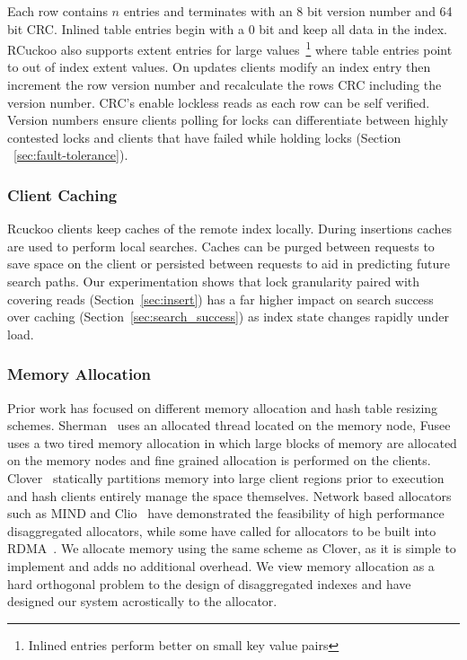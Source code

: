Each row contains $n$ entries and terminates with an 8 bit
version number and 64 bit CRC. Inlined table entries begin
with a 0 bit and keep all data in the index. RCuckoo also
supports extent entries for large values~\footnote{Inlined
entries perform better on small key value pairs} where table
entries point to out of index extent values. On updates
clients modify an index entry then increment the row version
number and recalculate the rows CRC including the version
number. CRC's enable lockless reads as each row can be self
verified. Version numbers ensure clients polling for locks
can differentiate between highly contested locks and clients
that have failed while holding locks (Section
~\ref{sec:fault-tolerance}).


\subsubsection{Client Caching}

Rcuckoo clients keep caches of the remote index locally.
During insertions caches are used to perform local searches.
Caches can be purged between requests to save space on the
client or persisted between requests to aid in predicting
future search paths. Our experimentation shows that lock
granularity paired with covering reads
(Section~\ref{sec:insert}) has a far higher impact on search
success over caching (Section~\ref{sec:search_success}) as
index state changes rapidly under load.

\subsubsection{Memory Allocation}
Prior work has focused on different memory allocation and
hash table resizing schemes. Sherman~\cite{sherman} uses an
allocated thread located on the memory node,
Fusee~\cite{fusee} uses a two tired memory allocation in
which large blocks of memory are allocated on the memory
nodes and fine grained allocation is performed on the
clients. Clover~\cite{clover} statically partitions memory
into large client regions prior to execution and hash
clients entirely manage the space themselves. Network based
allocators such as MIND and Clio~\cite{mind,clio} have
demonstrated the feasibility of high performance
disaggregated allocators, while some have called for
allocators to be built into RDMA~\cite{prism}. We allocate
memory using the same scheme as Clover, as it is simple to
implement and adds no additional overhead. We view memory
allocation as a hard orthogonal problem to the design of
disaggregated indexes and have designed our system
acrostically to the allocator.




